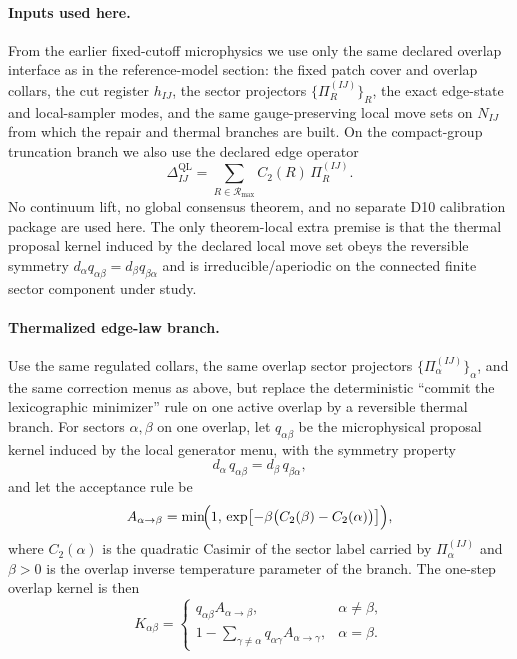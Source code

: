 \documentclass[11pt]{article}
\begin{document}
\paragraph{Inputs used here.}
From the earlier fixed-cutoff microphysics we use only the same declared overlap interface as in
the reference-model section: the fixed patch cover and overlap collars, the cut register
\(h_{IJ}\), the sector projectors \(\{\Pi_R^{(IJ)}\}_R\), the exact edge-state and local-sampler
modes, and the same gauge-preserving local move sets on \(N_{IJ}\) from which the repair and
thermal branches are built. On the compact-group truncation branch we also use the declared edge
operator
\[
\Delta_{IJ}^{\mathrm{QL}}
=
\sum_{R\in \mathcal R_{\max}} C_2(R)\,\Pi_R^{(IJ)}.
\]
No continuum lift, no global consensus theorem, and no separate D10 calibration package are used
here. The only theorem-local extra premise is that the thermal proposal kernel induced by the
declared local move set obeys the reversible symmetry
\(
d_\alpha q_{\alpha\beta}=d_\beta q_{\beta\alpha}
\)
and is irreducible/aperiodic on the connected finite sector component under study.

\paragraph{Thermalized edge-law branch.}
Use the same regulated collars, the same overlap sector projectors
$\{\Pi_\alpha^{(IJ)}\}_\alpha$, and the same correction menus as above, but replace the
deterministic ``commit the lexicographic minimizer'' rule on one active overlap by a reversible
thermal branch. For sectors $\alpha,\beta$ on one overlap, let $q_{\alpha\beta}$ be the
microphysical proposal kernel induced by the local generator menu, with the symmetry property
\begin{equation}
d_\alpha\,q_{\alpha\beta}=d_\beta\,q_{\beta\alpha},
\end{equation}
and let the acceptance rule be
\begin{equation}
A_{\alpha\to\beta}
=
\min\!\Bigl(
1,\,
\exp\bigl[-\beta\bigl(C_2(\beta)-C_2(\alpha)\bigr)\bigr]
\Bigr),
\end{equation}
where $C_2(\alpha)$ is the quadratic Casimir of the sector label carried by
$\Pi_\alpha^{(IJ)}$ and $\beta>0$ is the overlap inverse temperature parameter of the branch.
The one-step overlap kernel is then
\begin{equation}
K_{\alpha\beta}=
\begin{cases}
q_{\alpha\beta}A_{\alpha\to\beta}, & \alpha\neq \beta,\\[0.3em]
1-\sum_{\gamma\neq\alpha} q_{\alpha\gamma}A_{\alpha\to\gamma}, & \alpha=\beta.
\end{cases}
\end{equation}
\end{document}
